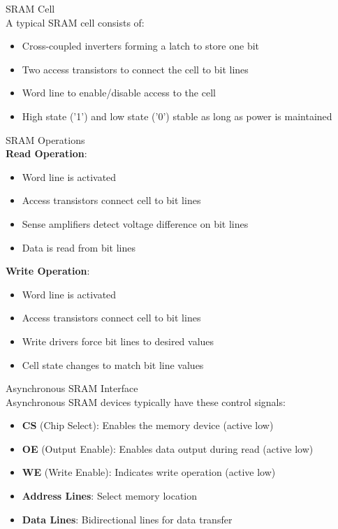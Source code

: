 \begin{definition}{SRAM Cell}\\
A typical SRAM cell consists of:
\begin{itemize}
    \item Cross-coupled inverters forming a latch to store one bit
    \item Two access transistors to connect the cell to bit lines
    \item Word line to enable/disable access to the cell
    \item High state ('1') and low state ('0') stable as long as power is maintained
\end{itemize}
\end{definition}

\begin{definition}{SRAM Operations}\\
\textbf{Read Operation}:
\begin{itemize}
    \item Word line is activated
    \item Access transistors connect cell to bit lines
    \item Sense amplifiers detect voltage difference on bit lines
    \item Data is read from bit lines
\end{itemize}
\textbf{Write Operation}:
\begin{itemize}
    \item Word line is activated
    \item Access transistors connect cell to bit lines
    \item Write drivers force bit lines to desired values
    \item Cell state changes to match bit line values
\end{itemize}
\end{definition}

\begin{definition}{Asynchronous SRAM Interface}\\
Asynchronous SRAM devices typically have these control signals:
\begin{itemize}
    \item \textbf{CS} (Chip Select): Enables the memory device (active low)
    \item \textbf{OE} (Output Enable): Enables data output during read (active low)
    \item \textbf{WE} (Write Enable): Indicates write operation (active low)
    \item \textbf{Address Lines}: Select memory location
    \item \textbf{Data Lines}: Bidirectional lines for data transfer
\end{itemize}
\end{definition}

